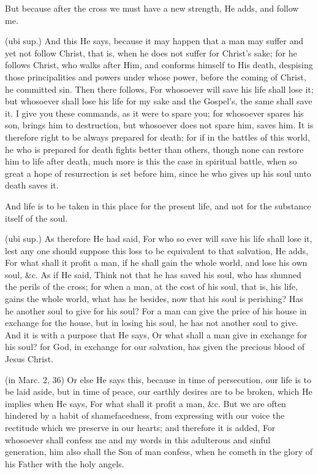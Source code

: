  But because after the cross we must have a new strength, He adds, and follow me.

 (ubi sup.) And this He says, because it may happen that a man may suffer and yet not follow Christ, that is, when he does not suffer for Christ’s sake; for he follows Christ, who walks after Him, and conforms himself to His death, despising those principalities and powers under whose power, before the coming of Christ, he committed sin. Then there follows, For whosoever will save his life shall lose it; but whosoever shall lose his life for my sake and the Gospel’s, the same shall save it. I give you these commands, as it were to spare you; for whosoever spares his son, brings him to destruction, but whosoever does not spare him, saves him. It is therefore right to be always prepared for death; for if in the battles of this world, he who is prepared for death fights better than others, though none can restore him to life after death, much more is this the case in spiritual battle, when so great a hope of resurrection is set before him, since he who gives up his soul unto death saves it.

 And life is to be taken in this place for the present life, and not for the substance itself of the soul.

 (ubi sup.) As therefore He had said, For who so ever will save his life shall lose it, lest any one should suppose this loss to be equivalent to that salvation, He adds, For what shall it profit a man, if he shall gain the whole world, and lose his own soul, \&c. As if He said, Think not that he has saved his soul, who has shunned the perils of the cross; for when a man, at the cost of his soul, that is, his life, gains the whole world, what has he besides, now that his soul is perishing? Has he another soul to give for his soul? For a man can give the price of his house in exchange for the house, but in losing his soul, he has not another soul to give. And it is with a purpose that He says, Or what shall a man give in exchange for his soul? for God, in exchange for our salvation, has given the precious blood of Jesus Christ.

 (in Marc. 2, 36) Or else He says this, because in time of persecution, our life is to be laid aside, but in time of peace, our earthly desires are to be broken, which He implies when He says, For what shall it profit a man, \&c. But we are often hindered by a habit of shamefacedness, from expressing with our voice the rectitude which we preserve in our hearts; and therefore it is added, For whosoever shall confess me and my words in this adulterous and sinful generation, him also shall the Son of man confess, when he cometh in the glory of his Father with the holy angels.

